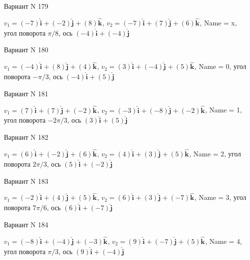 \documentclass[11pt]{report}
\begin{document}
Вариант N 179

$v_1 = \left(-7\right)\mathbf{\hat{i}_{}} + \left(-2\right)\mathbf{\hat{j}_{}} + \left(8\right)\mathbf{\hat{k}_{}}$, $v_2 = \left(-7\right)\mathbf{\hat{i}_{}} + \left(7\right)\mathbf{\hat{j}_{}} + \left(6\right)\mathbf{\hat{k}_{}}$, Name = x, угол поворота $\pi / 8$, ось $\left(-4\right)\mathbf{\hat{i}_{}} + \left(-4\right)\mathbf{\hat{j}_{}}$

Вариант N 180

$v_1 = \left(-4\right)\mathbf{\hat{i}_{}} + \left(8\right)\mathbf{\hat{j}_{}} + \left(4\right)\mathbf{\hat{k}_{}}$, $v_2 = \left(3\right)\mathbf{\hat{i}_{}} + \left(-4\right)\mathbf{\hat{j}_{}} + \left(5\right)\mathbf{\hat{k}_{}}$, Name = 0, угол поворота $- \pi / 3$, ось $\left(-4\right)\mathbf{\hat{i}_{}} + \left(5\right)\mathbf{\hat{j}_{}}$

Вариант N 181

$v_1 = \left(7\right)\mathbf{\hat{i}_{}} + \left(7\right)\mathbf{\hat{j}_{}} + \left(-2\right)\mathbf{\hat{k}_{}}$, $v_2 = \left(-3\right)\mathbf{\hat{i}_{}} + \left(-8\right)\mathbf{\hat{j}_{}} + \left(-2\right)\mathbf{\hat{k}_{}}$, Name = 1, угол поворота $- 2 \pi / 3$, ось $\left(3\right)\mathbf{\hat{i}_{}} + \left(5\right)\mathbf{\hat{j}_{}}$

Вариант N 182

$v_1 = \left(6\right)\mathbf{\hat{i}_{}} + \left(-2\right)\mathbf{\hat{j}_{}} + \left(6\right)\mathbf{\hat{k}_{}}$, $v_2 = \left(4\right)\mathbf{\hat{i}_{}} + \left(3\right)\mathbf{\hat{j}_{}} + \left(5\right)\mathbf{\hat{k}_{}}$, Name = 2, угол поворота $2 \pi / 3$, ось $\left(5\right)\mathbf{\hat{i}_{}} + \left(-2\right)\mathbf{\hat{j}_{}}$

Вариант N 183

$v_1 = \left(-2\right)\mathbf{\hat{i}_{}} + \left(4\right)\mathbf{\hat{j}_{}} + \left(5\right)\mathbf{\hat{k}_{}}$, $v_2 = \left(6\right)\mathbf{\hat{i}_{}} + \left(3\right)\mathbf{\hat{j}_{}} + \left(-7\right)\mathbf{\hat{k}_{}}$, Name = 3, угол поворота $7 \pi / 6$, ось $\left(6\right)\mathbf{\hat{i}_{}} + \left(-7\right)\mathbf{\hat{j}_{}}$

Вариант N 184

$v_1 = \left(-8\right)\mathbf{\hat{i}_{}} + \left(-4\right)\mathbf{\hat{j}_{}} + \left(-3\right)\mathbf{\hat{k}_{}}$, $v_2 = \left(9\right)\mathbf{\hat{i}_{}} + \left(-7\right)\mathbf{\hat{j}_{}} + \left(5\right)\mathbf{\hat{k}_{}}$, Name = 4, угол поворота $\pi / 3$, ось $\left(9\right)\mathbf{\hat{i}_{}} + \left(-4\right)\mathbf{\hat{j}_{}}$
\end{document}

